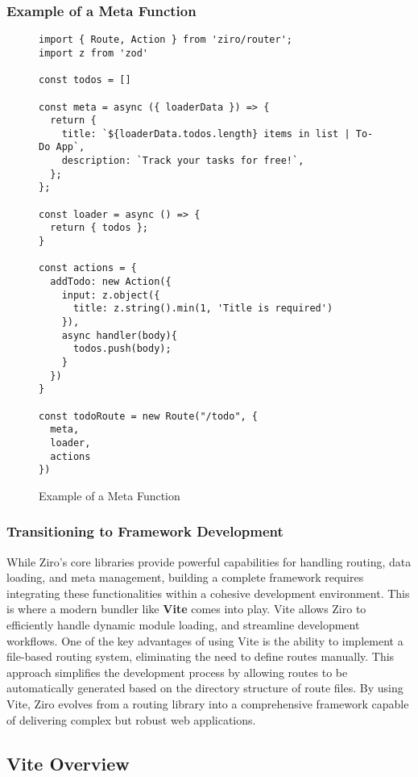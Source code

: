 \pagebreak
\subsubsection*{Example of a Meta Function}
\begin{figure}[h!]
\begin{verbatim}
import { Route, Action } from 'ziro/router';
import z from 'zod'

const todos = []

const meta = async ({ loaderData }) => {
  return {
    title: `${loaderData.todos.length} items in list | To-Do App`,
    description: `Track your tasks for free!`,
  };
};

const loader = async () => {
  return { todos };
}

const actions = {
  addTodo: new Action({
    input: z.object({
      title: z.string().min(1, 'Title is required')
    }),
    async handler(body){
      todos.push(body);
    }
  })
}

const todoRoute = new Route("/todo", {
  meta,
  loader,
  actions
})
\end{verbatim}
\caption{Example of a Meta Function}
\end{figure}

\pagebreak

\subsubsection{Transitioning to Framework Development}

While Ziro's core libraries provide powerful capabilities for handling routing, data loading, and meta management, building a complete framework requires integrating these functionalities within a cohesive development environment. This is where a modern bundler like \textbf{Vite} comes into play. Vite allows Ziro to efficiently handle dynamic module loading, and streamline development workflows. One of the key advantages of using Vite is the ability to implement a file-based routing system, eliminating the need to define routes manually. This approach simplifies the development process by allowing routes to be automatically generated based on the directory structure of route files. By using Vite, Ziro evolves from a routing library into a comprehensive framework capable of delivering complex but robust web applications.


\subsection{Vite Overview}

